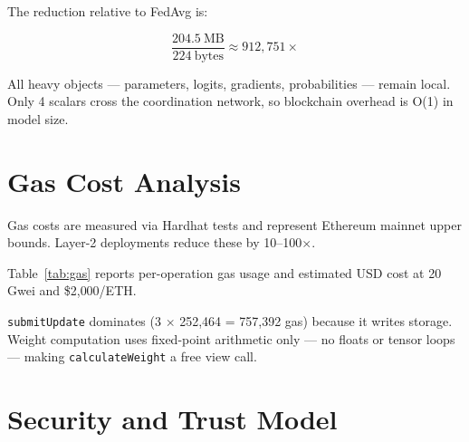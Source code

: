 \documentclass[conference]{IEEEtran}
\begin{document}
The reduction relative to FedAvg is:

\begin{equation}
\frac{204.5\ \text{MB}}{224\ \text{bytes}} \approx 912{,}751\times
\end{equation}

All heavy objects --- parameters, logits, gradients, probabilities --- remain local. Only 4 scalars cross the coordination network, so blockchain overhead is O(1) in model size.

\section{Gas Cost Analysis}

Gas costs are measured via Hardhat tests and represent Ethereum mainnet upper bounds. Layer-2 deployments reduce these by 10--100$\times$.

Table~\ref{tab:gas} reports per-operation gas usage and estimated USD cost at 20\,Gwei and \$2{,}000/ETH.

\begin{table}[H]
\centering
\caption{On-chain operation gas costs (Hardhat measurement, 20 Gwei, \$2{,}000/ETH)}
\label{tab:gas}
\end{table}

\texttt{submitUpdate} dominates (3 $\times$ 252,464 = 757,392 gas) because it writes storage. Weight computation uses fixed-point arithmetic only --- no floats or tensor loops --- making \texttt{calculateWeight} a free view call.

\section{Security and Trust Model}
\label{sec:security}
\end{document}
